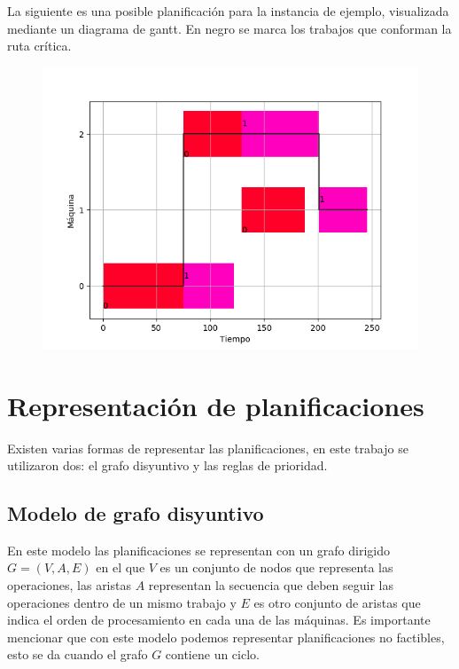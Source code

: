 La siguiente es una posible planificación para la instancia de ejemplo, visualizada mediante un diagrama de gantt. En negro se marca los trabajos que conforman la ruta crítica. 
\begin{figure}[H]
\centering
\includegraphics[scale=.5]{Imagenes/planejemplorc.png}
\end{figure}


\section{Representación de planificaciones}
Existen varias formas de representar las planificaciones, en este trabajo se utilizaron dos: el grafo disyuntivo y las reglas de prioridad.
\subsection*{Modelo de grafo disyuntivo} 
En este modelo las planificaciones se representan con un grafo dirigido $G=(V,A,E)$ en el que $V$ es un conjunto de nodos que representa las operaciones, las aristas $A$ representan la secuencia que deben seguir las operaciones dentro de un mismo trabajo y $E$ es otro conjunto de aristas que indica el orden de procesamiento en cada una de las máquinas. Es importante mencionar que con este modelo podemos representar planificaciones no factibles, esto se da cuando el grafo $G$ contiene un ciclo. 

